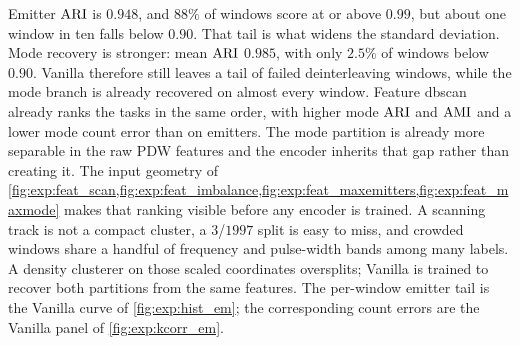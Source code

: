 Emitter $\mathrm{ARI}$ is $0.948$, and $88\%$ of windows score at or above $0.99$, but about one window in ten falls below $0.90$.
That tail is what widens the standard deviation.
Mode recovery is stronger: mean $\mathrm{ARI}$ $0.985$, with only $2.5\%$ of windows below $0.90$.
Vanilla therefore still leaves a tail of failed deinterleaving windows, while the mode branch is already recovered on almost every window.
Feature \gls{dbscan} already ranks the tasks in the same order, with higher mode $\mathrm{ARI}$ and $\mathrm{AMI}$ and a lower mode count error than on emitters.
The mode partition is already more separable in the raw PDW features and the encoder inherits that gap rather than creating it.
The input geometry of \cref{fig:exp:feat_scan,fig:exp:feat_imbalance,fig:exp:feat_maxemitters,fig:exp:feat_maxmode} makes that ranking visible before any encoder is trained.
A scanning track is not a compact cluster, a $3$/$1997$ split is easy to miss, and crowded windows share a handful of frequency and pulse-width bands among many labels.
A density clusterer on those scaled coordinates oversplits; Vanilla is trained to recover both partitions from the same features.
The per-window emitter tail is the Vanilla curve of \cref{fig:exp:hist_em}; the corresponding count errors are the Vanilla panel of \cref{fig:exp:kcorr_em}.
